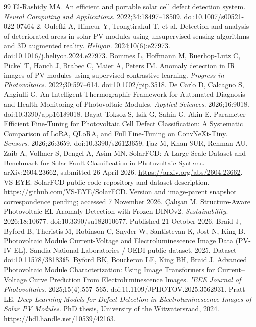 \documentclass[10pt,a4paper]{article}
\begin{document}
\begin{thebibliography}{99}
 El-Rashidy MA. An efficient and portable solar cell defect detection system. \emph{Neural Computing and Applications}. 2022;34:18497--18509. doi:10.1007/s00521-022-07464-2.
 Oulefki A, Himeur Y, Trongtirakul T, et al. Detection and analysis of deteriorated areas in solar PV modules using unsupervised sensing algorithms and 3D augmented reality. \emph{Heliyon}. 2024;10(6):e27973. doi:10.1016/j.heliyon.2024.e27973.
 Bommes L, Hoffmann M, Buerhop-Lutz C, Pickel T, Hauch J, Brabec C, Maier A, Peters IM. Anomaly detection in IR images of PV modules using supervised contrastive learning. \emph{Progress in Photovoltaics}. 2022;30:597--614. doi:10.1002/pip.3518.
 De Carlo D, Calcagno S, Angiulli G. An Intelligent Thermographic Framework for Automated Diagnosis and Health Monitoring of Photovoltaic Modules. \emph{Applied Sciences}. 2026;16:9018. doi:10.3390/app16189018.
 Bayat Toksoz S, Isik G, Sahin G, Akin E. Parameter-Efficient Fine-Tuning for Photovoltaic Cell Defect Classification: A Systematic Comparison of LoRA, QLoRA, and Full Fine-Tuning on ConvNeXt-Tiny. \emph{Sensors}. 2026;26:3659. doi:10.3390/s26123659.
 Ijaz M, Khan SUR, Rehman AU, Zaib A, Vollmer S, Dengel A, Asim MN. SolarFCD: A Large-Scale Dataset and Benchmark for Solar Fault Classification in Photovoltaic Systems. arXiv:2604.23662, submitted 26 April 2026. \url{https://arxiv.org/abs/2604.23662}.
 VS-EYE. SolarFCD public code repository and dataset description. \url{https://github.com/VS-EYE/SolarFCD}. Version and image-parent snapshot correspondence pending; accessed 7 November 2026.
 \c{C}al{\i}\c{s}an M. Structure-Aware Photovoltaic EL Anomaly Detection with Frozen DINOv2. \emph{Sustainability}. 2026;18:10677. doi:10.3390/su182010677. Published 21 October 2026.
 Braid J, Byford B, Theristis M, Robinson C, Snyder W, Santistevan K, Jost N, King B. Photovoltaic Module Current-Voltage and Electroluminescence Image Data (PV-IV-EL). Sandia National Laboratories / OEDI public dataset, 2025. Dataset doi:10.11578/3818365.
 Byford BK, Boucheron LE, King BH, Braid J. Advanced Photovoltaic Module Characterization: Using Image Transformers for Current--Voltage Curve Prediction From Electroluminescence Images. \emph{IEEE Journal of Photovoltaics}. 2025;15(4):557--565. doi:10.1109/JPHOTOV.2025.3562931.
 Pratt LE. \emph{Deep Learning Models for Defect Detection in Electroluminescence Images of Solar PV Modules}. PhD thesis, University of the Witwatersrand, 2024. \url{https://hdl.handle.net/10539/42163}.

\end{thebibliography}
\end{document}
